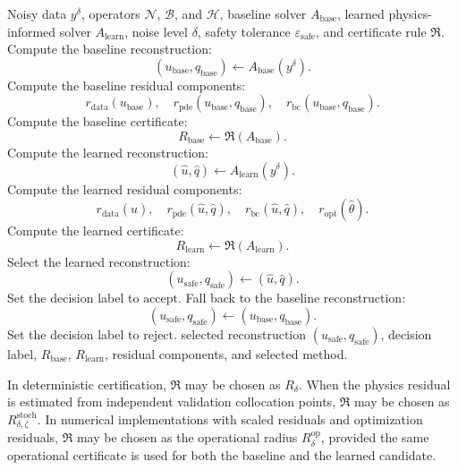 \documentclass{article}
\numberwithin{equation}{section}
\theoremstyle{definition}
\begin{document}
\begin{algorithm}[!ht]
\caption{No-harm certification and selection for physics-informed inverse learning}
\label{alg:no-harm-piil}
\begin{algorithmic}[1]
\Require Noisy data \(y^\delta\), operators \(\mathcal N\), \(\mathcal B\), and \(\mathcal H\), baseline solver \(A_{\mathrm{base}}\), learned physics-informed solver \(A_{\mathrm{learn}}\), noise level \(\delta\), safety tolerance \(\varepsilon_{\mathrm{safe}}\), and certificate rule \(\mathfrak R\).
\State Compute the baseline reconstruction:
\[
(u_{\mathrm{base}},q_{\mathrm{base}})
\gets
A_{\mathrm{base}}(y^\delta).
\]
\State Compute the baseline residual components:
\[
r_{\mathrm{data}}(u_{\mathrm{base}}),\quad
r_{\mathrm{pde}}(u_{\mathrm{base}},q_{\mathrm{base}}),\quad
r_{\mathrm{bc}}(u_{\mathrm{base}},q_{\mathrm{base}}).
\]
\State Compute the baseline certificate:
\[
R_{\mathrm{base}}
\gets
\mathfrak R(A_{\mathrm{base}}).
\]
\State Compute the learned reconstruction:
\[
(\widehat u,\widehat q)
\gets
A_{\mathrm{learn}}(y^\delta).
\]
\State Compute the learned residual components:
\[
r_{\mathrm{data}}(\widehat u),\quad
r_{\mathrm{pde}}(\widehat u,\widehat q),\quad
r_{\mathrm{bc}}(\widehat u,\widehat q),\quad
r_{\mathrm{opt}}(\widehat\theta).
\]
\State Compute the learned certificate:
\[
R_{\mathrm{learn}}
\gets
\mathfrak R(A_{\mathrm{learn}}).
\]
\State Select the learned reconstruction:
\[
(u_{\mathrm{safe}},q_{\mathrm{safe}})
\gets
(\widehat u,\widehat q).
\]
\State Set the decision label to \(\mathrm{accept}\).
\Else
\State Fall back to the baseline reconstruction:
\[
(u_{\mathrm{safe}},q_{\mathrm{safe}})
\gets
(u_{\mathrm{base}},q_{\mathrm{base}}).
\]
\State Set the decision label to \(\mathrm{reject}\).
\EndIf
\State \Return selected reconstruction \((u_{\mathrm{safe}},q_{\mathrm{safe}})\), decision label, \(R_{\mathrm{base}}\), \(R_{\mathrm{learn}}\), residual components, and selected method.
\end{algorithmic}
\end{algorithm}

In deterministic certification, \(\mathfrak R\) may be chosen as \(R_\delta\). When the physics residual is estimated from independent validation collocation points, \(\mathfrak R\) may be chosen as \(R_{\delta,\zeta}^{\mathrm{stoch}}\). In numerical implementations with scaled residuals and optimization residuals, \(\mathfrak R\) may be chosen as the operational radius \(R_\delta^{\mathrm{op}}\), provided the same operational certificate is used for both the baseline and the learned candidate.
\end{document}
